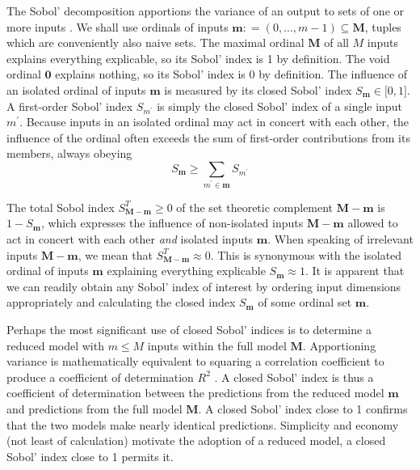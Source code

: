 \documentclass[preprint,12pt]{elsarticle}
\newcommand*{\M}[1]{\ensuremath{#1}\xspace}
\newcommand*{\mi}[1]{\mathbf{#1}}
\newcommand*{\deq}{\M{\mathrel{\mathop:}=}}
\begin{document}
    The Sobol' decomposition apportions the variance of an output to sets of one or more inputs \cite{Sobol2001}. We shall use ordinals of inputs $\mi{m}\deq(0,\ldots ,m-1) \subseteq \mi{M}$, tuples which are conveniently also naive sets. The maximal ordinal $\mi{M}$ of all $M$ inputs explains everything explicable, so its Sobol' index is 1 by definition. The void ordinal $\mi{0}$ explains nothing, so its Sobol' index is 0 by definition. 
    The influence of an isolated ordinal of inputs $\mi{m}$ is measured by its closed Sobol' index $S_{\mi{m}} \in \lbrack 0,1\rbrack$. A first-order Sobol' index $S_{m^{\prime}}$ is simply the closed Sobol' index of a single input $m^{\prime}$.
    Because inputs in an isolated ordinal may act in concert with each other, the influence of the ordinal often exceeds the sum of first-order contributions from its members, always obeying 
    \begin{equation*}
        S_{\mi{m}} \geq \sum_{m^{\prime} \in \mi{m}} S_{m^{\prime}}
    \end{equation*}

    The total Sobol index $S^{T}_{\mi{M-m}} \geq 0$ of the set theoretic complement $\mi{M-m}$ is $1-S_{\mi{m}}$, which expresses the influence of non-isolated inputs $\mi{M-m}$ allowed to act in concert with each other \emph{and} isolated inputs $\mi{m}$. When speaking of irrelevant inputs $\mi{M-m}$, we mean that $S^{T}_{\mi{M-m}} \approx 0$. This is synonymous with the isolated ordinal of inputs $\mi{m}$ explaining everything explicable $S_{\mi{m}}\approx 1$.
    It is apparent that we can readily obtain any Sobol' index of interest by ordering input dimensions appropriately and calculating the closed index $S_{\mi{m}}$ of some ordinal set $\mi{m}$.

    Perhaps the most significant use of closed Sobol' indices is to determine a reduced model with $m\leq M$ inputs within the full model $\mi{M}$.
    Apportioning variance is mathematically equivalent to squaring a correlation coefficient to produce a coefficient of determination $R^{2}$ \cite{Chicco2021}. A closed Sobol' index is thus a coefficient of determination between the predictions from the reduced model $\mi{m}$ and predictions from the full model $\mi{M}$. A closed Sobol' index close to 1 confirms that the two models make nearly identical predictions. Simplicity and economy (not least of calculation) motivate the adoption of a reduced model, a closed Sobol' index close to 1 permits it.
\end{document}

